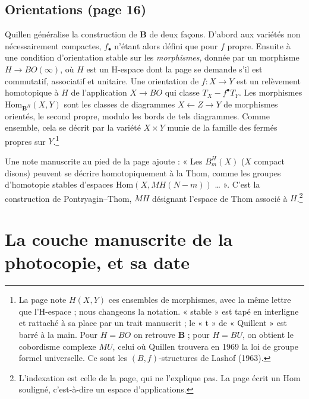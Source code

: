\documentclass[11pt,a4paper]{article}
\begin{document}
\subsection*{Orientations (page 16)}

Quillen généralise la construction de $\mathbf{B}$ de deux façons. D'abord aux
variétés non nécessairement compactes, $f_\bullet$ n'étant alors défini que
pour $f$ propre. Ensuite à une condition d'orientation stable sur les
\emph{morphismes}, donnée par un morphisme $H \to BO(\infty)$, où $H$ est un
H-espace dont la page se demande s'il est commutatif, associatif et unitaire.
Une orientation de $f : X \to Y$ est un relèvement homotopique à $H$ de
l'application $X \to BO$ qui classe $T_X - f^{\bullet}T_Y$. Les morphismes
$\mathrm{Hom}_{\mathbf{B}^{H}}(X, Y)$ sont les classes de diagrammes $X
\leftarrow Z \to Y$ de morphismes orientés, le second propre, modulo les bords
de tels diagrammes. Comme ensemble, cela se décrit par la variété $X \times Y$
munie de la famille des fermés propres sur $Y$.\footnote{La page note $H(X,Y)$
ces ensembles de morphismes, avec la même lettre que l'H-espace ; nous
changeons la notation. « stable » est tapé en interligne et rattaché à sa place
par un trait manuscrit ; le « t » de « Quillent » est barré à la main. Pour $H
= BO$ on retrouve $\mathbf{B}$ ; pour $H = BU$, on obtient le cobordisme
complexe $MU$, celui où Quillen trouvera en 1969 la loi de groupe formel
universelle. Ce sont les $(B,f)$-structures de Lashof (1963).}

Une note manuscrite au pied de la page ajoute : « Les $B^{H}_{m}(X)$ ($X$
compact disons) peuvent se décrire homotopiquement à la Thom, comme les
groupes d'homotopie stables d'espaces $\mathrm{Hom}(X, MH(N-m))$ … ». C'est la
construction de Pontryagin--Thom, $MH$ désignant l'espace de Thom associé à
$H$.\footnote{L'indexation est celle de la page, qui ne l'explique pas. La page
écrit un $\mathrm{Hom}$ souligné, c'est-à-dire un espace d'applications.}

\section*{La couche manuscrite de la photocopie, et sa date}
\end{document}
